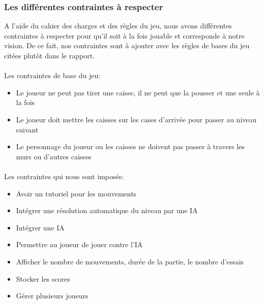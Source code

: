 \documentclass[a4paper,12pt]{article} %
\begin{document}
\newpage %
	\subsubsection{Les différentes contraintes à respecter}
	
	A l'aide du cahier des charges et des règles du jeu, nous avons différentes contraintes à respecter pour qu'il soit à la fois jouable et corresponde à notre vision. De ce fait, nos contraintes sont à ajouter avec les règles de bases du jeu citées plutôt dans le rapport.
	
\paragraph{}

Les contraintes de base du jeu:
\vspace{0.2cm}
\begin{itemize}
\item Le joueur ne peut pas tirer une caisse, il ne peut que la pousser et une seule à la fois
\item Le joueur doit mettre les caisses sur les cases d'arrivée pour passer au niveau suivant
\item Le personnage du joueur ou les caisses ne doivent pas passer à travers les murs ou d'autres caisses
\end{itemize}
\paragraph{}

Les contraintes qui nous sont imposés:
\vspace{0.2cm}
\begin{itemize}
\item Avoir un tutoriel pour les mouvements
\item Intégrer une résolution automatique du niveau par une IA
\item Intégrer une IA
\item Permettre au joueur de jouer contre l'IA
\item Afficher le nombre de mouvements, durée de la partie, le nombre d'essais
\item Stocker les scores
\item Gérer plusieurs joueurs
\end{itemize}
\end{document}

